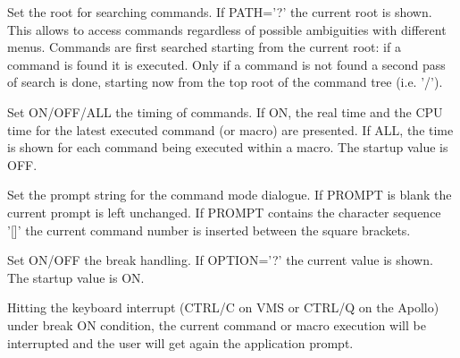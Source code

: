 \ENDCMD


\BEGARG
{}
\ENDARG

   \par
Set the root for searching commands.  If PATH='?' the current root is 
   shown.  This allows to access commands regardless of possible ambiguities 
   with different menus.  Commands are first searched starting from the 
   current root:  if a command is found it is executed.  Only if a command is 
   not found a second pass of search is done, starting now from the top root 
   of the command tree (i.e. '/').  

\ENDCMD


\BEGARG
{}
\ENDARG
{}
\ENDOPT

   \par
Set ON/OFF/ALL the timing of commands.  If ON, the real time and the CPU 
   time for the latest executed command (or macro) are presented.  If ALL, the 
   time is shown for each command being executed within a macro.  The startup 
   value is OFF.  

\ENDCMD


\BEGARG
{}
\ENDARG

   \par
Set the prompt string for the command mode dialogue.  If PROMPT is blank 
   the current prompt is left unchanged.  If PROMPT contains the character 
   sequence '[]' the current command number is inserted between the square 
   brackets.  

\ENDCMD


\BEGARG
{}
\ENDARG
{}
\ENDOPT

   \par
Set ON/OFF the break handling.  If OPTION='?' the current value is shown.  
   The startup value is ON.  

   \par
Hitting the keyboard interrupt (CTRL/C on VMS or CTRL/Q on the Apollo) 
   under break ON condition, the current command or macro execution will be 
   interrupted and the user will get again the application prompt.  

